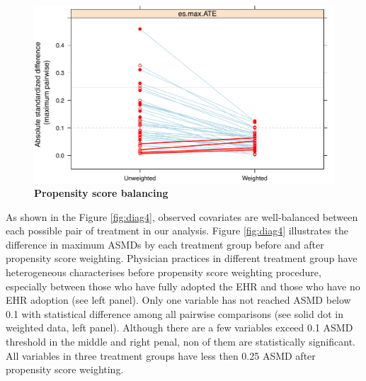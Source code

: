 \documentclass[12pt]{report}
\begin{document}
\begin{figure}[!htb]
\begin{center}
\includegraphics[width=\textwidth]{psdiag3.pdf}
\caption{{\bf Propensity score balancing}}
\label{fig:diag3}
\end{center}
\end{figure}

As shown in the Figure \ref{fig:diag4}, observed covariates are well-balanced between each possible pair of treatment in our analysis. Figure \ref{fig:diag4} illustrates the difference in maximum ASMDs by each treatment group before and after propensity score weighting. Physician practices in different treatment group have heterogeneous characterises before propensity score weighting procedure, especially between those who have fully adopted the EHR and those who have no EHR adoption (see left panel). Only one variable has not reached ASMD below 0.1 with statistical difference among all pairwise comparisons (see solid dot in weighted data, left panel). Although there are a few variables exceed 0.1 ASMD threshold in the middle and right penal, non of them are statistically significant. All variables in three treatment groups have less then 0.25 ASMD after propensity score weighting.
\end{document}
